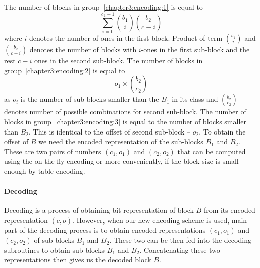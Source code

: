 The number of blocks in group~\ref{chapter3:encoding:1} is equal to
$$\sum_{i=0}^{c_1-1} {b_1\choose i} {b_2\choose c-i}$$ where $i$ denotes the number
of ones in the first block. Product of term ${b_1\choose i}$ and ${b_2\choose c-i}$
denotes the number of blocks with $i$-ones in the first sub-block and the rest
$c-i$ ones in the second sub-block. The number of blocks in group~\ref{chapter3:encoding:2}
is equal to $$o_1\times {b_2\choose c_2}$$ as $o_i$ is the number of sub-blocks smaller
than the $B_1$ in its class and ${b_2\choose c_2}$ denotes number of possible combinations
for second sub-block. The number of blocks in group~\ref{chapter3:encoding:3} is equal to
the number of blocks smaller than $B_2$. This is identical to the offset of second
sub-block -- $o_2$. To obtain the offset of $B$ we need the encoded representation
of the sub-blocks $B_1$ and $B_2$. These are two pairs of numbers $(c_1, o_1)$ and $(c_2, o_2)$
that can be computed using the on-the-fly encoding or more conveniently, if the block size is
small enough by table encoding.

\paragraph{Decoding}

Decoding is a process of obtaining bit representation of block $B$ from its encoded
representation $(c, o)$. However, when our new encoding scheme is used, main part
of the decoding process is to obtain encoded representations $(c_1, o_1)$ and
$(c_2, o_2)$ of sub-blocks $B_1$ and $B_2$. These two can be then fed into
the decoding subroutines to obtain sub-blocks $B_1$ and $B_2$. Concatenating these
two representations then gives us the decoded block $B$.

